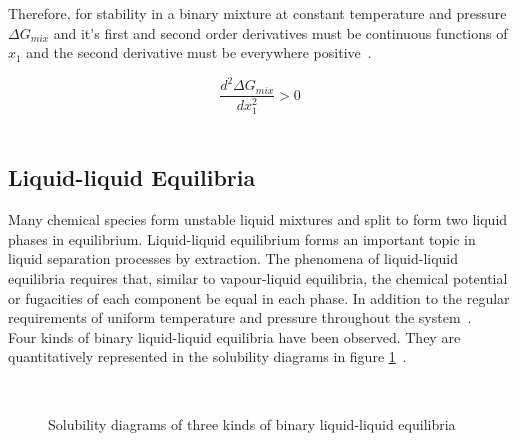 Therefore, for stability in a binary mixture at constant temperature and pressure $\Delta G_{mix}$ and it's first and second order derivatives must be continuous functions of $x_{1}$ and the second derivative must be everywhere positive~\cite{ SmithNessAbbott}.\

\begin{equation}
\frac{d^{2} \Delta G_{mix}}{ dx_{1}^{2} } > 0
\end{equation}\

\subsection{Liquid-liquid Equilibria} \label{LiquidLiquidEquilibriaSection}

Many chemical species form unstable liquid mixtures and split to form two liquid phases in equilibrium. Liquid-liquid equilibrium forms an important topic in liquid separation processes by extraction. The phenomena of liquid-liquid equilibria requires that, similar to vapour-liquid equilibria, the chemical potential or fugacities of each component be equal in each phase. In addition to the regular requirements of uniform temperature and pressure throughout the system~\cite{ SmithNessAbbott, BilevelOptimization}.\\

Four kinds of binary liquid-liquid equilibria have been observed. They are quantitatively represented in the solubility diagrams in figure \ref{BinaryLLEDrawing}~\cite{ SmithNessAbbott, Dechema, GasLiquidProperties}.\\

\begin{figure}[t]
\begin{center}
\resizebox{0.5\textwidth}{!}{}\\
\end{center}
\caption{Solubility diagrams of three kinds of binary liquid-liquid equilibria} \label{BinaryLLEDrawing}
\end{figure}	

